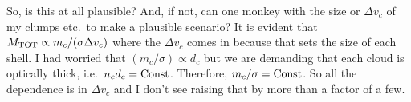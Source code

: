 \documentclass[11pt,letterpaper]{article}
\begin{document}
So, is this at all plausible?  And, if not, can one monkey with the
size or $\Delta v_c$ of my clumps etc.\ to make a plausible scenario?
It is evident that $M_{\rm TOT} \propto m_c / (\sigma \Delta v_c)$
where the $\Delta v_c$ comes in because that sets the size of each
shell.  I had worried that $(m_c / \sigma) \propto d_c$ but we are
demanding that each cloud is optically thick, i.e.\ $n_c d_c = {\rm
  Const}$.  Therefore, $m_c / \sigma = {\rm Const}$.  So all the
dependence is in $\Delta v_c$ and I don't see raising that by more
than a factor of a few.
\end{document}

